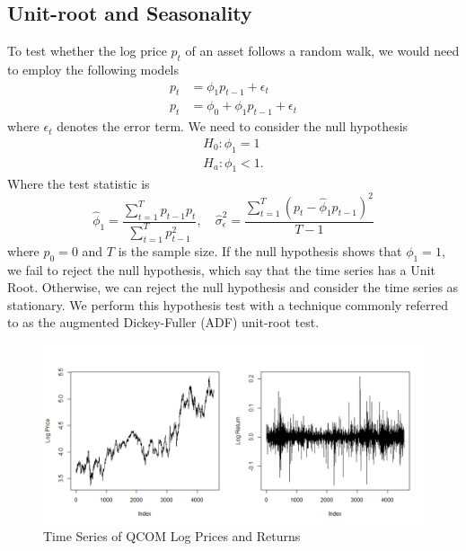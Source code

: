 \documentclass[12pt]{article}
\begin{document}
\subsection*{Unit-root and Seasonality}
To test whether the log price $p_t$ of an asset follows a random walk, we would need to employ the following models
\begin{equation}
	\begin{aligned}
		p_t&=\phi_1p_{t-1}+\epsilon_t\\
		p_t&=\phi_0+\phi_1p_{t-1}+\epsilon_t
	\end{aligned}
\end{equation}
where $\epsilon_t$ denotes the error term. We need to consider the null hypothesis
\begin{equation}
	\begin{aligned}
		H_0:\phi_1=1\\
		H_a:\phi_1<1.
	\end{aligned}
\end{equation}
Where the test statistic is
\begin{equation}
	\hat{\phi}_1=\frac{\sum_{t=1}^{T}p_{t-1}p_t}{\sum_{t=1}^{T}p^{2}_{t-1}},\quad\hat{\sigma}^2_\epsilon=\frac{\sum_{t=1}^{T}(p_t-\hat{\phi}_1p_{t-1})^2}{T-1}
\end{equation}
where $p_0=0$ and $T$ is the sample size. If the null hypothesis shows that $\phi_1=1$, we fail to reject the null hypothesis, which say that the time series has a Unit Root. Otherwise, we can reject the null hypothesis and consider the time series as stationary. We perform this hypothesis test with a technique commonly referred to as the augmented Dickey-Fuller (ADF) unit-root test.

\begin{figure}[h]
	\centering
	\includegraphics[width=0.9\linewidth]{plots/qcom_log_price_return.png}
	\caption{Time Series of QCOM Log Prices and Returns }
	\label{fig:qcom_log_price}
\end{figure}
\end{document}
